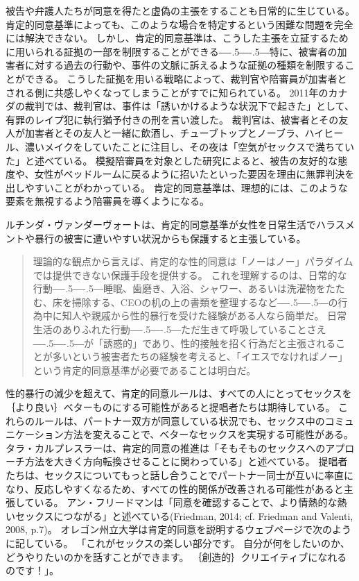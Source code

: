 \documentclass[paper=a4,book,openany]{jlreq}
\newcommand{\ig}[1]{}           %
\def\DDASH{―\kern-.5\zw―\kern-.5\zw―} %
\begin{document}
被告や弁護人たちが同意を得たと虚偽の主張をすることも日常的に生じている。
肯定的同意基準によっても、このような場合を特定するという困難な問題を完全には解決できない。
しかし、肯定的同意基準は、こうした主張を立証するために用いられる証拠の一部を制限することができる{\DDASH}特に、被害者の加害者に対する過去の行動や、事件の文脈に訴えるような証拠の種類を制限することができる。
こうした証拠を用いる戦略によって、裁判官や陪審員が加害者とされる側に共感しやくなってしまうことがすでに知られている。
2011年のカナダの裁判では、裁判官は、事件は「誘いかけるような状況下で起きた」として、有罪のレイプ犯に執行猶予付きの刑を言い渡した。
裁判官は、被害者とその友人が加害者とその友人と一緒に飲酒し、チューブトップとノーブラ、ハイヒール、濃いメイクをしていたことに注目し、その夜は「空気がセックスで満ちていた」と述べている\citep{cbc11:_manit_judge_rebuk_sex_assaul_remar}。
模擬陪審員を対象とした研究によると、被告の友好的な態度や、女性がベッドルームに戻るように招いたといった要因を理由に無罪判決を出しやすいことがわかっている\citep{finch06:_break_bound}。
肯定的同意基準は、理想的には、このような要素を無視するよう陪審員を導くようになる。

ルチンダ・ヴァンダーヴォート\ig{Lucinda Vandervort}は、肯定的同意基準が女性を日常生活でハラスメントや暴行の被害に遭いやすい状況からも保護すると主張している。

\begin{quote}
  理論的な観点から言えば、肯定的な性的同意は「ノーはノー」パラダイムでは提供できない保護手段を提供する。
これを理解するのは、日常的な行動{\DDASH}睡眠、歯磨き、入浴、シャワー、あるいは洗濯物をたたむ、床を掃除する、CEOの机の上の書類を整理するなど{\DDASH}の行為中に知人や親戚から性的暴行を受けた経験がある人なら簡単だ。
日常生活のありふれた行動{\DDASH}ただ生きて呼吸していることさえ{\DDASH}が「誘惑的」であり、性的接触を招く行為だと主張されることが多いという被害者たちの経験を考えると、「イエスでなければノー」という肯定的同意基準が必要であることは明白だ。
\citep[p.405]{vandervort12:_affir_sexual_consen_canad_law}
\end{quote}

性的暴行の減少を超えて、肯定的同意ルールは、すべての人にとってセックスを｛より良い｝{ベター}ものにする可能性があると提唱者たちは期待している。
これらのルールは、パートナー双方が同意している状況でも、セックス中のコミュニケーション方法を変えることで、ベターなセックスを実現する可能性がある。
タラ・カルプレスラーは、肯定的同意の推進は「そもそものセックスへのアプローチ方法を大きく方向転換させることに関わっている」と述べている。
提唱者たちは、セックスについてもっと話し合うことでパートナー同士が互いに率直になり、反応しやすくなるため、すべての性的関係が改善される可能性があると主張している。
アン・フリードマン\ig{Ann Friedman}は「同意を確認することで、より情熱的な熱いセックスにつながる」と述べている(Friedman, 2014; cf. Friedman and Valenti, 2008, p.7)。
\nocite{friedman14:_oh_yes_means_yes}\nocite{friedman08:_yes_means_yes}
オレゴン州立大学は肯定的同意を説明するウェブページで次のように記している。
「これがセックスの楽しい部分です。
自分が何をしたいのか、どうやりたいのかを話すことができます。
｛創造的｝{クリエイティブ}になれるのです！」\citep{moyer14:_how_calif_yes_means_yes}。
\end{document}

